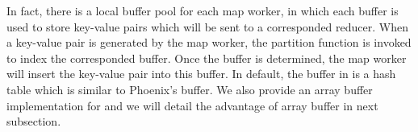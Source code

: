 


In fact, there is a local buffer pool for each map worker, in which each buffer is used to store key-value  pairs which will be sent to a corresponded reducer.
When a key-value pair is generated by the map worker, the partition function is invoked to index the corresponded buffer.
Once the buffer is determined, the map worker will insert the key-value pair into this buffer.
In default, the buffer in \myds is a hash table which is similar to Phoenix's buffer.
We also provide an array buffer implementation for \myds and we will detail the advantage of array buffer in next subsection.







